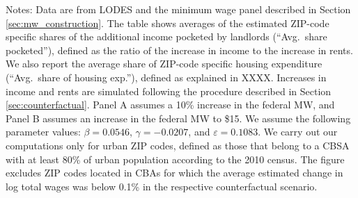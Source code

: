 \begin{table}[hbt!]
    \begin{minipage}{.95\textwidth} \footnotesize
        \vspace{2mm}
        Notes: 
        Data are from LODES and the minimum wage panel described in Section 
        \ref{sec:mw_construction}.
        The table shows averages of the estimated ZIP-code specific shares of the 
        additional income pocketed by landlords (``Avg.\ share pocketed''), 
        defined as the ratio of the increase in income to the increase in rents.
        We also report the average share of ZIP-code specific housing expenditure
        (``Avg.\ share of housing exp.''), defined as explained in XXXX.
        Increases in income and rents are simulated following the procedure 
        described in Section \ref{sec:counterfactual}.
        Panel A assumes a 10\% increase in the federal MW, and
        Panel B assumes an increase in the federal MW to \$15.
        We assume the following parameter values:
        $\beta = 0.0546$, $\gamma = -0.0207$, and $\varepsilon = 0.1083$.
        We carry out our computations only for urban ZIP codes, defined as 
        those that belong to a CBSA with at least 80\% of urban population
        according to the 2010 census.
        The figure excludes ZIP codes located in CBAs for which the average
        estimated change in log total wages was below 0.1\% in the respective
        counterfactual scenario.
    \end{minipage}
\end{table}
